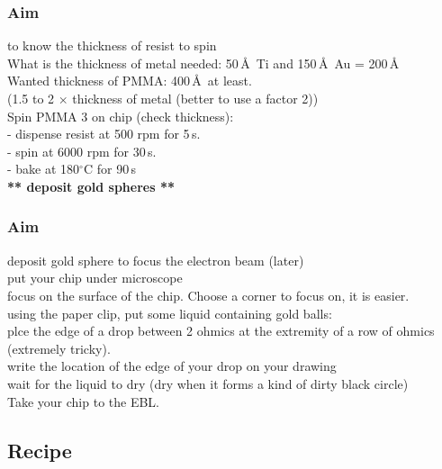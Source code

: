 \documentclass[12pt,a4paper]{report}
\begin{document}
\begin{enumerate}
\subsubsection{Aim}
to know the thickness of resist to spin\\

What is the thickness of metal needed: 50\,\AA~Ti and 150\,\AA~Au = 200\,\AA \\

Wanted thickness of PMMA: 400\,\AA  ~at least.\\
(1.5 to 2 $\times$ thickness of metal (better to use a factor 2))\\


Spin PMMA 3 on chip (check thickness):\\
- dispense resist at 500 rpm for 5\,s.\\
- spin at 6000 rpm for 30\,s.\\
- bake at 180$^{\circ}$C for 90\,s\\


\textbf{** deposit gold spheres **}\\

\subsubsection{Aim}
deposit gold sphere to focus the electron beam (later)\\

put your chip under microscope\\

focus on the surface of the chip. Choose a corner to focus on, it is easier.\\

using the paper clip, put some liquid containing gold balls:\\
plce the edge of a drop between 2 ohmics at the extremity of a row of ohmics (extremely tricky).\\

write the location of the edge of your drop on your drawing\\

wait for the liquid to dry (dry when it forms a kind of dirty black circle)\\

Take your chip to the EBL.\\

\newpage


\subsection{Recipe}


\end{enumerate}
\end{document}
